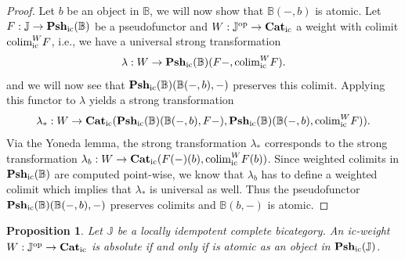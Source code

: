 \documentclass[12pt,oneside,reqno,a4paper]{article}
\newtheorem{proposition}[theorem]{Proposition}
\theoremstyle{definition}
\newcommand{\op}{^\textup{op}}
\newcommand{\Catic}{\textbf{\textup{Cat}}_\textup{ic}}
\newcommand{\Pshic}[1]{\textbf{\textup{Psh}}_\textup{ic}(#1)}
\newcommand{\bB}{\mathbb{B}}
\newcommand{\bJ}{\mathbb{J}}
\newcommand{\colimic}{\textup{colim}_{\textup{ic}}}
\begin{document}
\begin{proof}
Let $b$ be an object in $\bB$, we will now show that $\bB(-,b)$ is atomic. Let $F:\bJ\to\Pshic{\bB}$ be a pseudofunctor and $W:\bJ\op\to\Catic$ a weight with colimit $\colimic^W F$, i.e., we have a universal strong transformation
\begin{align*}
\lambda:W\to \Pshic{\bB}(F-,\colimic^W F).
\end{align*}
and we will now see that $\Pshic{\bB}(\bB(-,b),-)$ preserves this colimit. Applying this functor to $\lambda$ yields a strong transformation
\begin{align*}
\lambda_* :W \to \Catic(\Pshic{\bB}(\bB(-,b),F-),\Pshic{\bB}(\bB(-,b),\colimic^W F)).
\end{align*}
Via the Yoneda lemma, the strong transformation $\lambda_*$ corresponds to the strong transformation $\lambda_b:W\to \Catic(F(-)(b),\colimic^W F(b))$. Since weighted colimits in $\Pshic{\bB}$ are computed point-wise, we know that $\lambda_b$ has to define a weighted colimit which implies that $\lambda_*$ is universal as well. Thus the pseudofunctor $\Pshic{\bB}(\bB(-,b),-)$ preserves colimits and $\bB(b,-)$ is atomic.
\end{proof}

\begin{proposition}\label{absato2}
Let $\bJ$ be a locally idempotent complete bicategory. An ic-weight $W:\bJ\op\to\Catic$ is absolute if and only if is atomic as an object in $\Pshic{\bJ}$.
\end{proposition}
\end{document}
